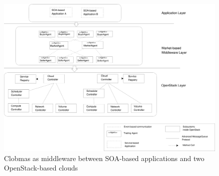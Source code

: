 \documentclass[10pt,journal,compsoc]{IEEEtran}
\begin{document}
\begin{figure}[htbp]
    \centering
    \includegraphics[scale=0.36]{drawings/Overall_Structure.pdf}
    \caption{Clobmas as middleware between SOA-based applications and two OpenStack-based clouds \label{fig:architectural_context}}
\end{figure}

%
\end{document}
